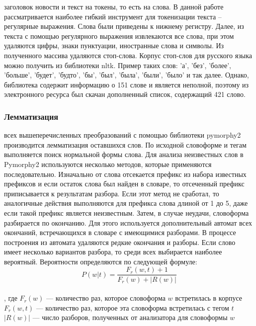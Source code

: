 \documentclass{article}
\newcommand\tab[1][1cm]{\hspace*{#1}}
\begin{document}
 заголовок новости и текст на токены, то есть на слова. В данной работе рассматривается наиболее гибкий инструмент для токенизации текста – регулярные выражения. Слова были приведены к нижнему регистру. Далее, из текста с помощью регулярного выражения извлекаются все слова, при этом удаляются цифры, знаки пунктуации, иностранные слова и символы. Из полученного массива удаляются стоп-слова. Корпус стоп-слов для русского языка можно получить из библиотеки nltk. Пример таких слов: 'а', 'без', 'более', 'больше', 'будет', 'будто', 'бы', 'был', 'была', 'были', 'было' и так далее. Однако, библиотека содержит информацию о 151 слове и является неполной, поэтому из электронного ресурса был скачан дополненный список, содержащий 421 слово. \\
\subsubsection{Лемматизация}
 всех вышеперечисленных преобразований с помощью библиотеки pymorphy2 производится лемматизация оставшихся слов. По исходной словоформе и тегам выполняется поиск нормальной формы слова. Для анализа неизвестных слов в Pymorphy2 используются несколько методов, которые применяются последовательно. Изначально от слова отсекается префикс из набора известных префиксов и если остаток слова был найден в словаре, то отсеченный префикс приписывается к результатам разбора. Если этот метод не сработал, то аналогичные действия выполняются для префикса слова длиной от 1 до 5, даже если такой префикс является неизвестным. Затем, в случае неудачи, словоформа разбирается по окончанию. Для этого используется дополнительный автомат всех окончаний, встречающихся в словаре с имеющимися разборами. В процессе построения из автомата удаляются редкие окончания и разборы. Если слово имеет несколько вариантов разбора, то среди всех выбирается наиболее вероятный. Вероятности определяются по следующей формуле:\\
$$P(w|t) = \frac{F_{r}(w,t)+1}{F_{r}(w)+|R(w)|}$$\\
, где $F_{r}(w)$ — количество раз, которое словоформа $w$ встретилась в корпусе\\
\tab$F_{r}(w,t)$ — количество раз, которое эта словоформа встретилась с тегом $t$\\
\tab$|R(w)|$ — число разборов, полученных от анализатора для словоформы $w$\\
\\
\end{document}
